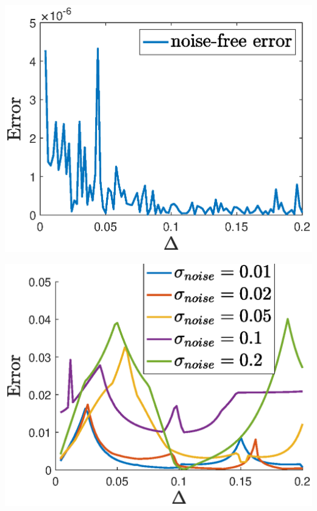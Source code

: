 \documentclass[a0paper,portrait,fontscale=0.35]{baposter}
\theoremstyle{plain}
\theoremstyle{plain}
\theoremstyle{definition}
\theoremstyle{plain}
\theoremstyle{definition}
\begin{document}
\begin{poster}
{\begin{minipage}[t]{0.51\textwidth}
    \vspace{0.5em}
    \begin{minipage}[h]{0.97\textwidth}
      \begin{minipage}[h]{0.5\textwidth}
        \centering
        \includegraphics[height=0.12\textheight]{img/1d_error_noisefree.eps}
      \end{minipage}
      \begin{minipage}[h]{0.5\textwidth}
        \centering
        \includegraphics[height=0.12\textheight]{img/1d_error_noisy.eps}
      \end{minipage}


\end{minipage}
\end{minipage}}
\end{poster}
\end{document}
